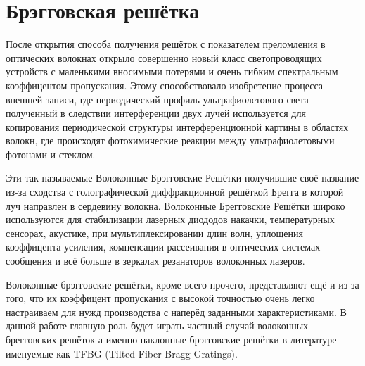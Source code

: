 \section{Брэгговская решётка}
После открытия способа получения решёток с показателем преломления в оптических волокнах
открыло совершенно новый класс светопроводящих устройств с маленькими вносимыми потерями и очень
гибким спектральным коэффицентом пропускания. Этому способствовало изобретение процесса внешней записи, где периодический профиль ультрафиолетового света полученный в следствии интерференции двух лучей используется для копирования периодической структуры интерференционной картины в областях волокн, где происходят фотохимические реакции между ультрафиолетовыми фотонами и стеклом.
\par
Эти так называемые Волоконные Брэгговские Решётки получившие своё название из-за сходства с голографической диффракционной решёткой Брегга в которой луч направлен в сердевину волокна.
Волоконные Брегговские Решётки широко используются для стабилизации лазерных диододов накачки, температурных сенсорах, акустике, при мультиплексировании длин волн, уплощения коэффицента усиления, компенсации рассеивания в оптических системах сообщения и всё больше в зеркалах резанаторов волоконных лазеров.

Волоконные брэгговские решётки, кроме всего прочего, представляют ещё и из-за того, что их коэффицент пропускания с высокой точностью очень легко настраиваем для нужд производства с наперёд заданными характеристиками.
В данной работе главную роль будет играть частный случай волоконных брегговских решёток а именно наклонные брэгговские решётки в литературе именуемые как  TFBG (Tilted Fiber Bragg Gratings).